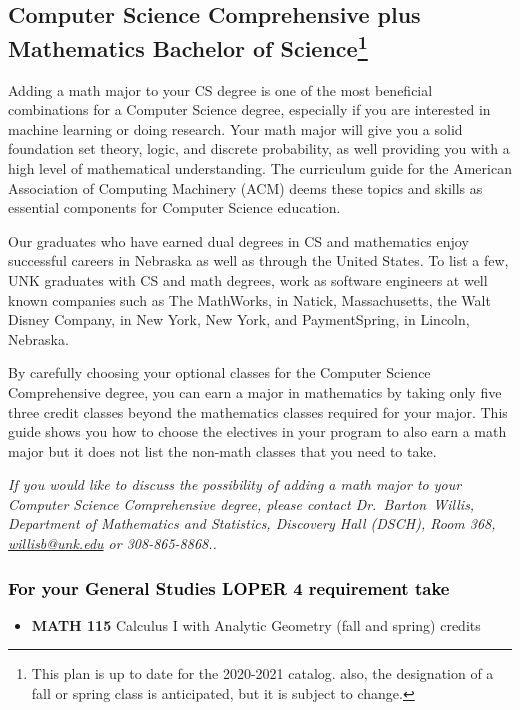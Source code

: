 \documentclass[10pt]{article}
\makeatletter
\newcommand{\calcone}{\textbf{MATH 115} Calculus I with Analytic Geometry (fall and spring) \dotfill 5 credits}
\newcommand{\contactbw}{\mbox{Dr.\ Barton Willis}, Department of Mathematics and Statistics,  Discovery Hall (DSCH), Room 368,
\href{mailto:willisb@unk.edu}{willisb@unk.edu} or 308-865-8868.}
\makeatother
\begin{document}
\vspace{-0.1in}
\subsection*{\textbf{\textcolor{unkblue}{Computer Science Comprehensive plus
Mathematics Bachelor of Science\footnote[1]{This plan is up to date for the 2020-2021 catalog. also, the designation of a fall or spring class is anticipated, but it is subject to change.
}}}}

Adding a math major to your CS degree is one of the most beneficial combinations for a Computer Science degree, especially if you are interested in machine learning or doing research.  Your math major  will give you a solid foundation set theory, logic, and discrete probability, as well providing you with a high level of mathematical understanding.   The curriculum guide for the American Association of Computing Machinery (ACM) deems  these topics and skills  as essential components for  Computer Science education.

Our graduates who have  earned dual degrees in CS and mathematics enjoy successful careers in Nebraska as well as through the United States.  To list a few, UNK graduates with CS and math degrees, work as software engineers at well known companies such as The MathWorks, in Natick, Massachusetts, the Walt Disney Company, in New York, New York, and PaymentSpring, in Lincoln, Nebraska.

By carefully choosing your optional classes for the Computer Science Comprehensive degree, you can earn a major in mathematics by taking only five three credit classes beyond the mathematics classes required for your major. This guide shows you how to choose the electives in your program to also earn a math major but it does not list the non-math classes that you need to take.

  \textcolor{unkblue}{\emph{If you would like to discuss the possibility of
  adding a math major to your Computer Science Comprehensive degree,
  please contact \contactbw.}}

\subsubsection*{\textcolor{black}{For  your General Studies LOPER 4 requirement take}}
\begin{itemize}
\item \calcone
\end{itemize}
\end{document}
